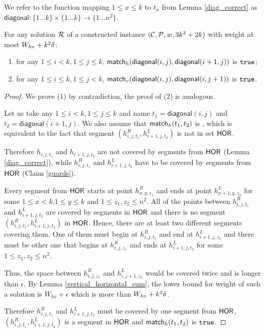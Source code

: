 \newcommand{\diagonal}{\mathsf{diagonal}}
We refer to the function mapping $1 \le x \le k$ to $t_x$ from Lemma \ref{diag_correct}
as $\diagonal : \{1 \ldots k\} \times \{1 \ldots k\} \rightarrow \{1 \ldots n^2\}$.

\begin{lemma}
\label{vertical_horizontal_synchronized}
For any solution $\mathcal{R}$
of a constructed instance $(\mathcal{C}, \mathcal{P}, w, 3k^2+2k)$
with weight at most $W_{hv} +k^2\delta$:
\begin{enumerate}
\item 
for any $1 \le i < k, 1 \le j \le k$,
$\matchh(\diagonal(i, j),\diagonal(i+1, j))$ is $\texttt{true}$;
\item 
for any $1 \le i \le k, 1 \le j < k$,
$\matchv(\diagonal(i, j),\diagonal(i, j+1))$ is $\texttt{true}$.
\end{enumerate}
\end{lemma}

\begin{proof}
We prove (1) by contradiction, the proof of (2) is analogous.

Let us take any $1 \le i < k, 1 \le j \le k$
and name $t_1 = \diagonal(i, j)$ and $t_2 = \diagonal(i+1, j)$.
We also assume that $\mathsf{match}_h(t_1,t_2)$ is \false,
which is equivalent to the fact that
segment $(h_{i,j,t_1}^R, h_{i+1,j,t_2}^L)$
is not in set $\mathsf{HOR}$.

Therefore $h_{i,j,t_1}$ and $h_{i+1,j,t_2}$
are not covered by segments from $\mathsf{HOR}$ (Lemma \ref{diag_correct}),
while $h^R_{i,j,t_1}$ and $h^L_{i+1,j,t_2}$
have to be covered by segments from $\mathsf{HOR}$ (Claim \ref{guards}).

Every segment from $\mathsf{HOR}$ starts at point $h^R_{x,y,z_1}$
and ends at point $h^L_{x+1,y,z_2}$ for some
$1 \le x < k$,$1 \le y \le k$ and $1 \le z_1, z_2 \le n^2$.
All of the points between $h^R_{i,j,t_1}$ and $h^L_{i+1,j,t_2}$
are covered by segments in $\mathsf{HOR}$ 
and there is no segment $(h^R_{i,j,t_1}, h^L_{i+1,j,t_2})$ in $\mathsf{HOR}$.
Hence, there are at least two different segments covering them.
One of them must begin
at $h^R_{i,j,t_1}$ and end at $h^L_{i+1,j,z_2}$
and there must be other one that begins at $h^R_{i,j,z_1}$
and ends at $h^L_{i+1,j,t_2}$
for some $1 \le z_1, z_2 \le n^2$.

Thus, the space between $h^R_{i,j,z_1}$ and $h^L_{i,j+1,z_2}$
would be covered twice and is longer than $\epsilon$.
By Lemma \ref{vertical_horizontal_sum},
the lower bound for weight of such a solution is $W_{hv} + \epsilon$
which is more than $W_{hv} +k^2\delta$.

Therefore $h^R_{i,j,t_1}$ and $h^L_{i+1,j,t_2}$ must be covered
by one segment from $\mathsf{HOR}$,
$(h^R_{i,j,t_1}, h^L_{i+1,j,t_2})$ is a segment in $\mathsf{HOR}$
and $\mathsf{match}_h(t_1,t_2)$ is $\texttt{true}$.
\end{proof}


